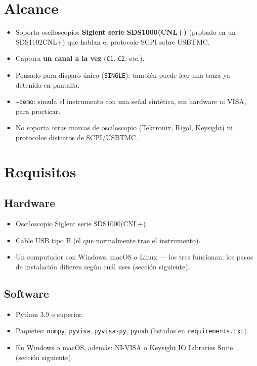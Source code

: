 \documentclass[11pt,a4paper]{article}
\begin{document}
\section{Alcance}
\begin{itemize}
  \item Soporta osciloscopios \textbf{Siglent serie SDS1000(CNL+)} (probado
        en un SDS1102CNL+) que hablan el protocolo SCPI sobre USBTMC.
  \item Captura \textbf{un canal a la vez} (\texttt{C1}, \texttt{C2}, etc.).
  \item Pensado para disparo único (\texttt{SINGLE}); también puede leer una
        traza ya detenida en pantalla.
  \item \texttt{--demo}: simula el instrumento con una señal sintética, sin
        hardware ni VISA, para practicar.
  \item No soporta otras marcas de osciloscopio (Tektronix, Rigol,
        Keysight) ni protocolos distintos de SCPI/USBTMC.
\end{itemize}

\section{Requisitos}

\subsection{Hardware}
\begin{itemize}
  \item Osciloscopio Siglent serie SDS1000(CNL+).
  \item Cable USB tipo B (el que normalmente trae el instrumento).
  \item Un computador con Windows, macOS o Linux --- los tres funcionan; los
        pasos de instalación difieren según cuál uses (sección siguiente).
\end{itemize}

\subsection{Software}
\begin{itemize}
  \item Python 3.9 o superior.
  \item Paquetes: \texttt{numpy}, \texttt{pyvisa}, \texttt{pyvisa-py},
        \texttt{pyusb} (listados en \texttt{requirements.txt}).
  \item En Windows o macOS, además: NI-VISA o Keysight IO Libraries Suite
        (sección siguiente).
\end{itemize}
\end{document}
